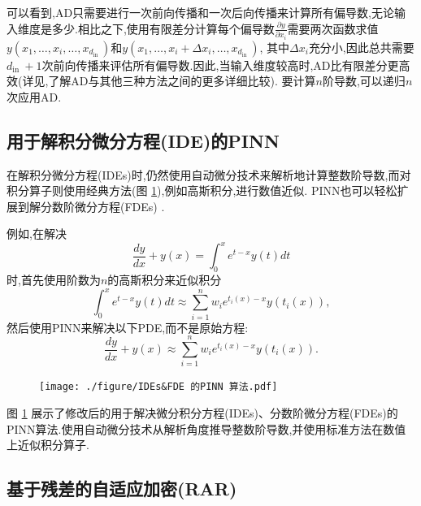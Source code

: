 \documentclass{Sichuan Normal University}
\begin{document}
可以看到,$\mathrm{AD}$只需要进行一次前向传播和一次后向传播来计算所有偏导数,无论输入维度是多少.相比之下,使用有限差分计算每个偏导数$\frac{\partial y}{\partial x_i}$需要两次函数求值$y\left(x_1, \ldots, x_i, \ldots, x_{d_{\text {in }}}\right)$和$y\left(x_1, \ldots, x_i+\Delta x_i, \ldots, x_{d_{\text {in }}}\right)$,
其中$\Delta x_i$充分小,因此总共需要$d_{\text {in }}+1$次前向传播来评估所有偏导数.因此,当输入维度较高时,AD比有限差分更高效(详见\cite{margossianReviewAutomaticDifferentiation2019},了解$\mathrm{AD}$与其他三种方法之间的更多详细比较).
要计算$n$阶导数,可以递归$n$次应用AD.

\subsection{用于解积分微分方程(IDE)的PINN}

在解积分微分方程(IDEs)时,仍然使用自动微分技术来解析地计算整数阶导数,而对积分算子则使用经典方法(图 \ref{fig:求解 IDEs&FDE 的 PINN 算法}),例如高斯积分,进行数值近似.
PINN也可以轻松扩展到解分数阶微分方程(FDEs) \cite{pangFPINNsFractionalPhysicsInformed2019}.

例如,在解决
\begin{equation}
\frac{d y}{d x}+y(x)=\int_0^x e^{t-x} y(t) d t
\end{equation}
时,首先使用阶数为$n$的高斯积分来近似积分
\begin{equation}
\int_0^x e^{t-x} y(t) d t \approx \sum_{i=1}^n w_i e^{t_i(x)-x} y\left(t_i(x)\right),
\end{equation}
然后使用PINN来解决以下PDE,而不是原始方程:
\begin{equation}
\frac{d y}{d x}+y(x) \approx \sum_{i=1}^n w_i e^{t_i(x)-x} y\left(t_i(x)\right) .
\end{equation}

\begin{figure}[H]
    \centering
    \texttt{[image: ./figure/IDEs\&FDE 的PINN 算法.pdf]}
    \label{fig:求解 IDEs&FDE 的 PINN 算法}
    \end{figure}
图 \ref{fig:求解 IDEs&FDE 的 PINN 算法} 展示了修改后的用于解决微分积分方程(IDEs)、分数阶微分方程(FDEs)的PINN算法.使用自动微分技术从解析角度推导整数阶导数,并使用标准方法在数值上近似积分算子.

\subsection{基于残差的自适应加密(RAR)}\label{sec:基于残差的自适应加密(RAR)}
\end{document}
